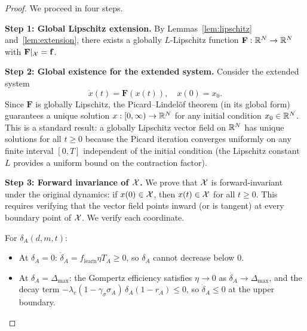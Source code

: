 \begin{proof}
We proceed in four steps.

\textbf{Step 1: Global Lipschitz extension.}
By Lemmas~\ref{lem:lipschitz} and~\ref{lem:extension}, there exists a
globally $L$-Lipschitz function $\mathbf{F}: \mathbb{R}^N \to \mathbb{R}^N$ with
$\mathbf{F}|_{\mathcal{X}} = \mathbf{f}$.

\textbf{Step 2: Global existence for the extended system.}
Consider the extended system
\[
\dot{x}(t) = \mathbf{F}(x(t)), \quad x(0) = x_0.
\]
Since $\mathbf{F}$ is globally Lipschitz, the Picard--Lindel\"of theorem (in
its global form) guarantees a unique solution $x: [0, \infty) \to \mathbb{R}^N$
for any initial condition $x_0 \in \mathbb{R}^N$. This is a standard result: a
globally Lipschitz vector field on $\mathbb{R}^N$ has unique solutions for all
$t \geq 0$ because the Picard iteration converges uniformly on any finite
interval $[0, T]$ independent of the initial condition (the Lipschitz
constant $L$ provides a uniform bound on the contraction factor).

\textbf{Step 3: Forward invariance of $\mathcal{X}$.}
We prove that $\mathcal{X}$ is forward-invariant under the original dynamics: if
$x(0) \in \mathcal{X}$, then $x(t) \in \mathcal{X}$ for all $t \geq 0$. This requires
verifying that the vector field points inward (or is tangent) at every
boundary point of $\mathcal{X}$. We verify each coordinate.

For $\delta_A(d,m,t)$:
\begin{itemize}
\item At $\delta_A = 0$: $\dot{\delta}_A = f_{\mathrm{learn}} \eta T_A \geq 0$,
  so $\delta_A$ cannot decrease below $0$.
\item At $\delta_A = \Delta_{\max}$: the Gompertz efficiency satisfies
  $\eta \to 0$ as $\delta_A \to \Delta_{\max}$, and the decay term
  $-\lambda_c (1 - \gamma_\sigma \sigma_A)\,\delta_A (1 - r_A) \leq 0$,
  so $\dot{\delta}_A \leq 0$ at the upper boundary.
\end{itemize}


\end{proof}
